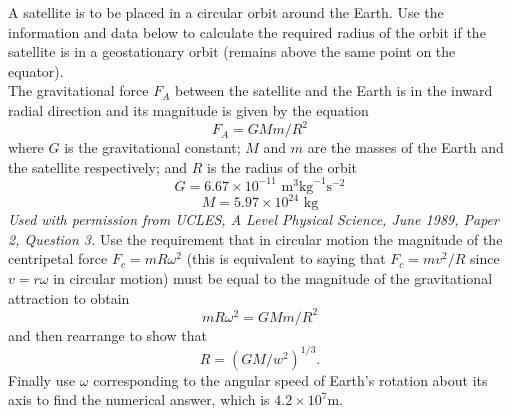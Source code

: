 \begin{hint}[A1989PSIIQ3l] 
{A satellite is to be placed in a circular orbit around the Earth. Use the information and data below to calculate the required radius of the orbit if the satellite is in a geostationary orbit (remains above the same point on the equator). \\ The gravitational force $F_A$ between the satellite and the Earth is in the inward radial direction and its magnitude is given by the equation 
\begin{equation*}
F_A=GMm/R^2
\end{equation*}
where $G$ is the gravitational constant; $M$ and $m$ are the masses of the Earth and the satellite respectively; and $R$ is the radius of the orbit
}
{
\begin{equation*}
G=6.67\times 10^{-11} \textrm{ m}^3\textrm{kg}^{-1}\textrm{s}^{-2}
\end{equation*}
\begin{equation*}
M=5.97\times 10^{24} \textrm{ kg}
\end{equation*}
  }
{\textit{Used with permission from UCLES, A Level Physical Science, June 1989, Paper 2, Question 3.}
}
{Use the requirement that in circular motion the magnitude of the centripetal force $F_c=mR\omega^2$ (this is equivalent to saying that $F_c=mv^2/R$ since $v=r\omega$ in circular motion) must be equal to the magnitude of the gravitational attraction to obtain \begin{equation*}
mR\omega^2=GMm/R^2
\end{equation*}
 and then rearrange to show that
 \begin{equation*}
{R={(GM/w^2)}^{1/3}.}
\end{equation*} 
Finally use $\omega$ corresponding to the angular speed of Earth's rotation about its axis to find the numerical answer, which is $4.2\times 10^7$m.}
\end{hint}